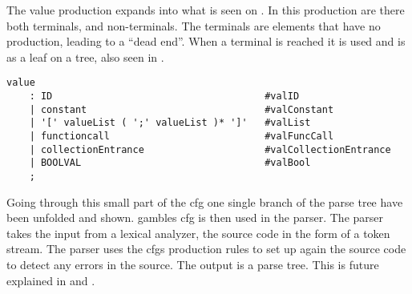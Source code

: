 The value production expands into what is seen on .
In this production are there both terminals, and non-terminals.
The terminals are elements that have no production, leading to a ``dead end''.
When a terminal is reached it is used and is as a leaf on a tree, also seen in .
\begin{lstlisting}[caption={\acrshort{cfg} Value},frame=tlrb,label={lst:value},numbers=none]
value
    : ID                                     #valID
    | constant                               #valConstant
    | '[' valueList ( ';' valueList )* ']'   #valList
    | functioncall                           #valFuncCall
    | collectionEntrance                     #valCollectionEntrance
    | BOOLVAL                                #valBool
    ;
\end{lstlisting}

Going through this small part of the \acrshort{cfg} one single branch of the parse tree have been unfolded and shown.
\gls{gamble}s \acrshort{cfg} is then used in the parser.
The parser takes the input from a lexical analyzer, the source code in the form of a token stream.
The parser uses the \acrshort{cfg}s production rules to set up again the source code to detect any errors in the source.
The output is a parse tree.
This is future explained in  and .